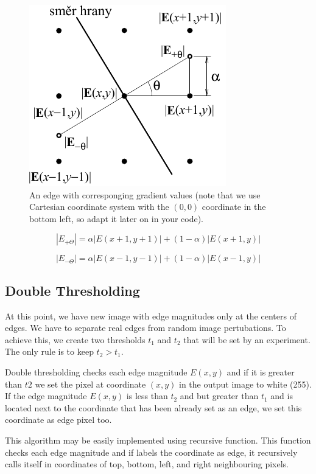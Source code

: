 \documentclass[12pt]{article}
\begin{document}
\begin{figure}[h]
\begin{centering}
    \includegraphics{pixel_scheme}
    \caption{An edge with corresponging gradient values (note that we use Cartesian coordinate system with the $(0, 0)$ coordinate in the bottom left, so adapt it later on in your code).}
    \label{fig:pixe-scheme}
\end{centering}
\end{figure}

\begin{equation}
    |E_{+\Theta}| = \alpha |E(x + 1, y + 1)| + (1 - \alpha) |E(x + 1, y)|
\end{equation}

\begin{equation}
    |E_{-\Theta}| = \alpha |E(x - 1, y - 1)| + (1 - \alpha) |E(x - 1, y)|
\end{equation}

\subsection*{Double Thresholding}

At this point, we have new image with edge magnitudes only at the centers of edges.
We have to separate real edges from random image pertubations.
To achieve this, we create two thresholds $t_1$ and $t_2$ that will be set by an experiment.
The only rule is to keep $t_2 > t_1$.

Double thresholding checks each edge magnitude $E(x, y)$ and if it is greater than $t2$ we set the pixel at coordinate $(x, y)$
in the output image to white (255). If the edge magnitude $E(x, y)$ is less than $t_2$ and but greater than $t_1$ and is
located next to the coordinate that has been already set as an edge, we set this coordinate as edge pixel too.

This algorithm may be easily implemented using recursive function. This function checks each edge magnitude and if labels
the coordinate as edge, it recursively calls itself in coordinates of top, bottom, left, and right neighbouring pixels.
\end{document}
